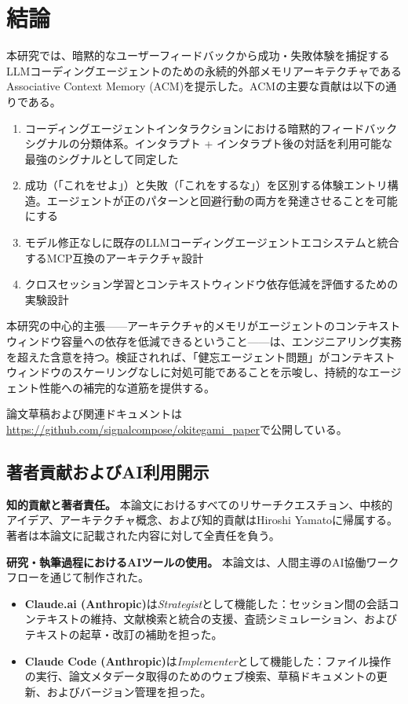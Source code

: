 \documentclass[conference]{IEEEtran}
\begin{document}
\section{結論}

本研究では、暗黙的なユーザーフィードバックから成功・失敗体験を捕捉するLLMコーディングエージェントのための永続的外部メモリアーキテクチャであるAssociative Context Memory (ACM)を提示した。ACMの主要な貢献は以下の通りである。

\begin{enumerate}
\item コーディングエージェントインタラクションにおける暗黙的フィードバックシグナルの分類体系。インタラプト + インタラプト後の対話を利用可能な最強のシグナルとして同定した
\item 成功（「これをせよ」）と失敗（「これをするな」）を区別する体験エントリ構造。エージェントが正のパターンと回避行動の両方を発達させることを可能にする
\item モデル修正なしに既存のLLMコーディングエージェントエコシステムと統合するMCP互換のアーキテクチャ設計
\item クロスセッション学習とコンテキストウィンドウ依存低減を評価するための実験設計
\end{enumerate}

本研究の中心的主張——アーキテクチャ的メモリがエージェントのコンテキストウィンドウ容量への依存を低減できるということ——は、エンジニアリング実務を超えた含意を持つ。検証されれば、「健忘エージェント問題」がコンテキストウィンドウのスケーリングなしに対処可能であることを示唆し、持続的なエージェント性能への補完的な道筋を提供する。

論文草稿および関連ドキュメントは\url{https://github.com/signalcompose/okitegami_paper}で公開している。

\subsection*{著者貢献およびAI利用開示}

\textbf{知的貢献と著者責任。}
本論文におけるすべてのリサーチクエスチョン、中核的アイデア、アーキテクチャ概念、および知的貢献はHiroshi Yamatoに帰属する。著者は本論文に記載された内容に対して全責任を負う。

\textbf{研究・執筆過程におけるAIツールの使用。}
本論文は、人間主導のAI協働ワークフローを通じて制作された。

\begin{itemize}
\item \textbf{Claude.ai (Anthropic)}は\emph{Strategist}として機能した：セッション間の会話コンテキストの維持、文献検索と統合の支援、査読シミュレーション、およびテキストの起草・改訂の補助を担った。
\item \textbf{Claude Code (Anthropic)}は\emph{Implementer}として機能した：ファイル操作の実行、論文メタデータ取得のためのウェブ検索、草稿ドキュメントの更新、およびバージョン管理を担った。
\end{itemize}
\end{document}

